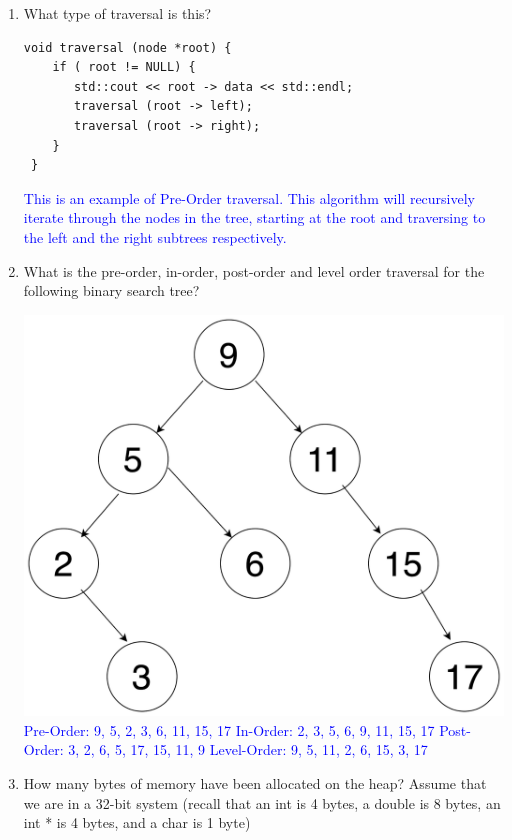 \documentclass{article}
\begin{document}
\begin{enumerate}[label=(\alph*)]
    \item \textbf{} What type of traversal is this?
    \begin{lstlisting}[style=CStyle]
void traversal (node *root) {
    if ( root != NULL) {
       std::cout << root -> data << std::endl;
       traversal (root -> left);
       traversal (root -> right);
    }
 }
    \end{lstlisting}
    
\textcolor{blue}{This is an example of Pre-Order traversal. This algorithm will recursively iterate through the nodes in the tree, starting at the root and traversing to the left and the right subtrees respectively.}

    \item \textbf{}
What is the pre-order, in-order, post-order and level order traversal for the following binary search tree?

\includegraphics[scale = 0.125]{figures/bst2.png}\newline
\textcolor{blue}{Pre-Order: 9, 5, 2, 3, 6, 11, 15, 17}\newline
\textcolor{blue}{In-Order: 2, 3, 5, 6, 9, 11, 15, 17}\newline
\textcolor{blue}{Post-Order: 3, 2, 6, 5, 17, 15, 11, 9}\newline
\textcolor{blue}{Level-Order: 9, 5, 11, 2, 6, 15, 3, 17}\newline
\item \textbf{}
How many bytes of memory have been allocated on the heap? Assume that we are in a 32-bit system (recall that an int is 4 bytes, a double is 8 bytes, an int * is 4 bytes, and a char is 1 byte)


\end{enumerate}
\end{document}
